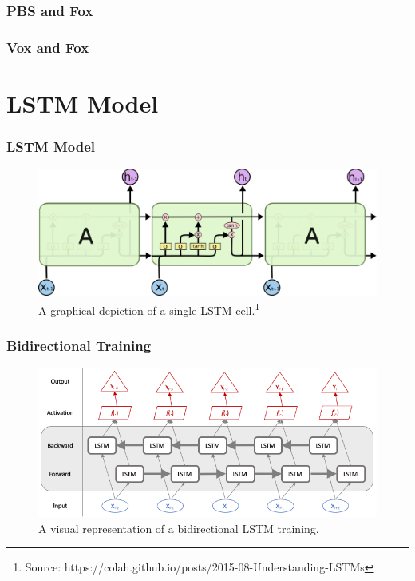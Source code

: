 \documentclass{beamer}
\begin{document}
	\begin{frame}
		\frametitle{PBS and Fox}
		
	\end{frame}

	\begin{frame}
		\frametitle{Vox and Fox}
		
	\end{frame}
	

\section{LSTM Model}

    \begin{frame}
    	\frametitle{LSTM Model}
    	\begin{figure}[H]
    		\includegraphics[width=\textwidth]{figures/images/lstm-math.png}
    		\caption{A graphical depiction of a single LSTM cell.\footnote{Source: https://colah.github.io/posts/2015-08-Understanding-LSTMs}}
    	\end{figure}
    \end{frame}

    \begin{frame}
    	\frametitle{Bidirectional Training}
    	\begin{figure}[H]
    		\includegraphics[width=\textwidth]{figures/images/bidirectional-net.png}
    		\caption{A visual representation of a bidirectional LSTM training.}
    	\end{figure}
    \end{frame}
\end{document}
